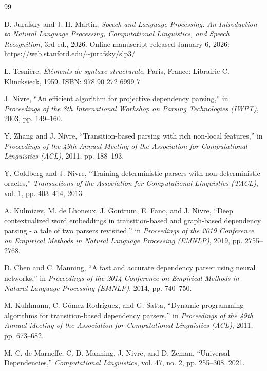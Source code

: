 \documentclass[12pt,letterpaper]{article}
\begin{document}
\clearpage
\begin{thebibliography}{99}

D. Jurafsky and J. H. Martin, \emph{Speech and Language Processing: An Introduction to Natural Language Processing, Computational Linguistics, and Speech Recognition}, 3rd ed., 2026. Online manuscript released January 6, 2026: \url{https://web.stanford.edu/~jurafsky/slp3/}

L. Tesnière, \emph{Éléments de syntaxe structurale}, Paris, France: Librairie C. Klincksieck, 1959. ISBN: 978 90 272 6999 7

J. Nivre, ``An efficient algorithm for projective dependency parsing,'' in \emph{Proceedings of the 8th International Workshop on Parsing Technologies (IWPT)}, 2003, pp. 149--160.

Y. Zhang and J. Nivre, ``Transition-based parsing with rich non-local features,'' in \emph{Proceedings of the 49th Annual Meeting of the Association for Computational Linguistics (ACL)}, 2011, pp. 188--193.

Y. Goldberg and J. Nivre, ``Training deterministic parsers with non-deterministic oracles,'' \emph{Transactions of the Association for Computational Linguistics (TACL)}, vol. 1, pp. 403--414, 2013.

A. Kulmizev, M. de Lhoneux, J. Gontrum, E. Fano, and J. Nivre, ``Deep contextualized word embeddings in transition-based and graph-based dependency parsing - a tale of two parsers revisited,'' in \emph{Proceedings of the 2019 Conference on Empirical Methods in Natural Language Processing (EMNLP)}, 2019, pp. 2755--2768.

D. Chen and C. Manning, ``A fast and accurate dependency parser using neural networks,'' in \emph{Proceedings of the 2014 Conference on Empirical Methods in Natural Language Processing (EMNLP)}, 2014, pp. 740--750.

M. Kuhlmann, C. Gómez-Rodríguez, and G. Satta, ``Dynamic programming algorithms for transition-based dependency parsers,'' in \emph{Proceedings of the 49th Annual Meeting of the Association for Computational Linguistics (ACL)}, 2011, pp. 673--682.

M.-C. de Marneffe, C. D. Manning, J. Nivre, and D. Zeman, ``Universal Dependencies,'' \emph{Computational Linguistics}, vol. 47, no. 2, pp. 255--308, 2021.


\end{thebibliography}
\end{document}
